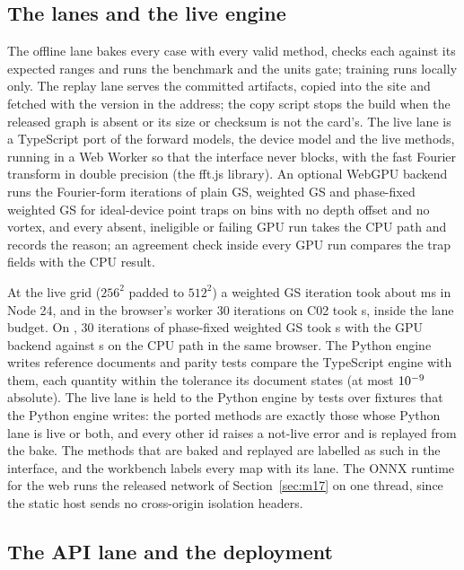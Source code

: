 \subsection{The lanes and the live engine}\label{sec:live}

The offline lane bakes every case with every valid method, checks each against its expected ranges and runs the benchmark and the units gate; training runs locally only. The replay lane serves the committed artifacts, copied into the site and fetched with the version in the address; the copy script stops the build when the released graph is absent or its size or checksum is not the card's. The live lane is a TypeScript port of the forward models, the device model and the live methods, running in a Web Worker so that the interface never blocks, with the fast Fourier transform in double precision (the fft.js library). An optional WebGPU backend runs the Fourier-form iterations of plain GS, weighted GS and phase-fixed weighted GS for ideal-device point traps on bins with no depth offset and no vortex, and every absent, ineligible or failing GPU run takes the CPU path and records the reason; an agreement check inside every GPU run compares the trap fields with the CPU result.

At the live grid ($256^2$ padded to $512^2$) a weighted GS iteration took about \liveIterMs{} ms in Node 24, and in the browser's worker 30 iterations on C02 took \liveWorkerS{} s, inside the lane budget. On \liveAdapter{}, 30 iterations of phase-fixed weighted GS took \liveGpuS{} s with the GPU backend against \liveCpuS{} s on the CPU path in the same browser. The Python engine writes \liveFixtures{} reference documents and \liveTests{} parity tests compare the TypeScript engine with them, each quantity within the tolerance its document states (at most $10^{-9}$ absolute). The live lane is held to the Python engine by tests over fixtures that the Python engine writes: the ported methods are exactly those whose Python lane is live or both, and every other id raises a not-live error and is replayed from the bake. The methods that are baked and replayed are labelled as such in the interface, and the workbench labels every map with its lane. The ONNX runtime for the web runs the released network of Section~\ref{sec:m17} on one thread, since the static host sends no cross-origin isolation headers.

\subsection{The API lane and the deployment}\label{sec:arch-api}

